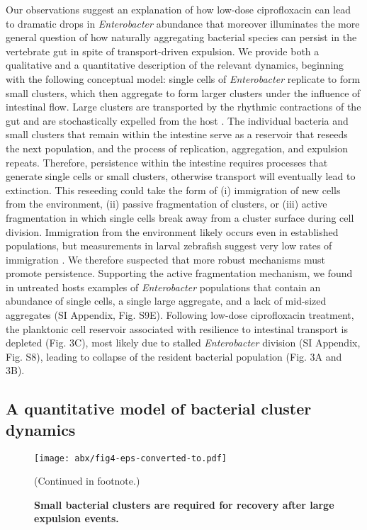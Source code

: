 Our observations suggest an explanation of how low-dose ciprofloxacin can lead to dramatic drops in \textit{Enterobacter} abundance that moreover illuminates the more general question of how naturally aggregating bacterial species can persist in the vertebrate gut in spite of transport-driven expulsion. We provide both a qualitative and a quantitative description of the relevant dynamics, beginning with the following conceptual model: single cells of \textit{Enterobacter}  replicate to form small clusters, which then aggregate to form larger clusters under the influence of intestinal flow. Large clusters are transported by the rhythmic contractions of the gut \cite{Wiles2016,Logan2018,ganz2018} and are stochastically expelled from the host \cite{Wiles2016,Logan2018}. The individual bacteria and small clusters that remain within the intestine serve as a reservoir that reseeds the next population, and the process of replication, aggregation, and expulsion repeats. Therefore, persistence  within the intestine requires processes that generate single cells or small clusters, otherwise transport will eventually lead to extinction. This reseeding could take the form of (i) immigration of new cells from the environment, (ii) passive fragmentation of  clusters, or (iii) active fragmentation in which single cells break away from a cluster surface during cell division. Immigration from the environment likely occurs even in established populations, but measurements in larval zebrafish suggest very low rates of immigration \cite{robinson2018experimental}. We therefore suspected that more robust mechanisms must promote persistence. Supporting the active fragmentation mechanism, we found in untreated hosts examples of \textit{Enterobacter} populations that contain an abundance of single cells, a single large aggregate, and a lack of mid-sized aggregates (SI Appendix, Fig. S9E). Following low-dose ciprofloxacin treatment, the planktonic cell reservoir associated with resilience to intestinal transport is depleted (Fig. 3C), most likely due to stalled \textit{Enterobacter} division (SI Appendix, Fig. S8), leading to collapse of the resident bacterial population (Fig. 3A and 3B).




 \subsection{A quantitative model of bacterial cluster dynamics}

\begin{figure}%
\centerline{
	\texttt{[image: abx/fig4-eps-converted-to.pdf]}}
	\caption{\textbf{Small bacterial clusters are required for recovery after large expulsion events.}}{(Continued in footnote.)}  
	\label{fig:fig4}
\end{figure}

